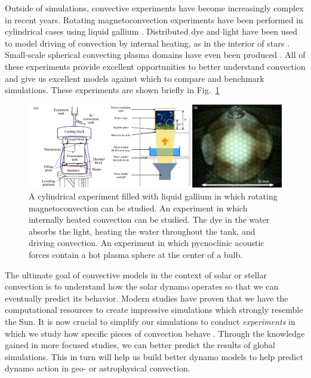 Outside of simulations, convective experiments have become increasingly complex in recent years.
Rotating magnetoconvection experiments have been performed in cylindrical cases using liquid gallium \citep{aurnou&all2018}.
Distributed dye and light have been used to model driving of convection by internal heating, as in the interior of stars \citep{bouillaut&all2019}.
Small-scale spherical convecting plasma domains have even been produced \citep{koulakis&all2018}.
All of these experiments provide excellent opportunities to better understand convection and give us excellent models against which to compare and benchmark simulations.
These experiments are shown briefly in Fig.~\ref{fig:convective_experiments}

\begin{figure}[t!]
\vspace{0.25cm}
\includegraphics[width=\textwidth]{./figs/intro/convective_experiments.pdf}
\caption[Modern convective laboratory experiments.]
{
	\citep[left, Fig.~1a of][]{aurnou&all2018} A cylindrical experiment filled with liquid gallium in which rotating magnetoconvection can be studied.
	\citep[middle, Fig.~1a of][]{bouillaut&all2019} An experiment in which internally heated convection can be studied.
	The dye in the water absorbs the light, heating the water throughout the tank, and driving convection.
	\citep[right, Fig.~3a of][]{koulakis&all2018} An experiment in which pycnoclinic acoustic forces contain a hot plasma sphere at the center of a bulb.
	\label{fig:convective_experiments} 
}
\end{figure}


The ultimate goal of convective models in the context of solar or stellar convection is to understand how the solar dynamo operates so that we can eventually predict its behavior.
Modern studies have proven that we have the computational resources to create impressive simulations which strongly resemble the Sun.
It is now crucial to simplify our simulations to conduct \emph{experiments} in which we study how specific pieces of convection behave \citep[such as in the studies of tachocline interactions of][]{wood&brummell2018}.
Through the knowledge gained in more focused studies, we can better predict the results of global simulations.
This in turn will help us build better dynamo models to help predict dynamo action in geo- or astrophysical convection.


